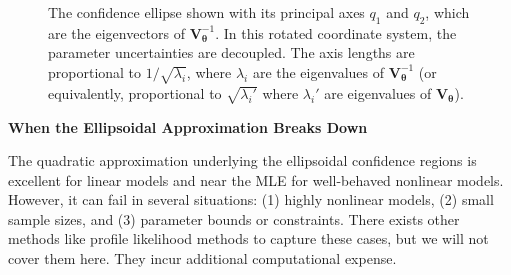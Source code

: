 \begin{figure}[h!]
    \centering
    \caption{The confidence ellipse shown with its principal axes $q_1$ and $q_2$, which are the eigenvectors of $\mathbf{V}_{\boldsymbol{\theta}}^{-1}$. In this rotated coordinate system, the parameter uncertainties are decoupled. The axis lengths are proportional to $1/\sqrt{\lambda_i}$, where $\lambda_i$ are the eigenvalues of $\mathbf{V}_{\boldsymbol{\theta}}^{-1}$ (or equivalently, proportional to $\sqrt{\lambda_i'}$ where $\lambda_i'$ are eigenvalues of $\mathbf{V}_{\boldsymbol{\theta}}$).}
    \label{fig:principal_axes}
\end{figure}

\begin{warningBox}
    \textbf{When the Ellipsoidal Approximation Breaks Down}
    
    The quadratic approximation underlying the ellipsoidal confidence regions is excellent for linear models and near the MLE for well-behaved nonlinear models. However, it can fail in several situations: (1) highly nonlinear models, (2) small sample sizes, and (3) parameter bounds or constraints. There exists other methods like profile likelihood methods to capture these cases, but we will not cover them here. They incur additional computational expense.
\end{warningBox}

